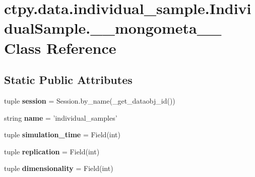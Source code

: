\hypertarget{classctpy_1_1data_1_1individual__sample_1_1_individual_sample_1_1____mongometa____}{\section{ctpy.\-data.\-individual\-\_\-sample.\-Individual\-Sample.\-\_\-\-\_\-mongometa\-\_\-\-\_\- Class Reference}
\label{classctpy_1_1data_1_1individual__sample_1_1_individual_sample_1_1____mongometa____}
}
\subsection*{Static Public Attributes}
\begin{DoxyCompactItemize}
\item 
\hypertarget{classctpy_1_1data_1_1individual__sample_1_1_individual_sample_1_1____mongometa_____a2503272356a85d365ca5fe9022dc2bd3}{tuple {\bfseries session} = Session.\-by\-\_\-name(\-\_\-get\-\_\-dataobj\-\_\-id())}\label{classctpy_1_1data_1_1individual__sample_1_1_individual_sample_1_1____mongometa_____a2503272356a85d365ca5fe9022dc2bd3}

\item 
\hypertarget{classctpy_1_1data_1_1individual__sample_1_1_individual_sample_1_1____mongometa_____ab3e1a4de8dc2663ae335ba2ff826632c}{string {\bfseries name} = 'individual\-\_\-samples'}\label{classctpy_1_1data_1_1individual__sample_1_1_individual_sample_1_1____mongometa_____ab3e1a4de8dc2663ae335ba2ff826632c}

\item 
\hypertarget{classctpy_1_1data_1_1individual__sample_1_1_individual_sample_1_1____mongometa_____a7879ac06f9f17ba10c7d6c874b6c3a6a}{tuple {\bfseries simulation\-\_\-time} = Field(int)}\label{classctpy_1_1data_1_1individual__sample_1_1_individual_sample_1_1____mongometa_____a7879ac06f9f17ba10c7d6c874b6c3a6a}

\item 
\hypertarget{classctpy_1_1data_1_1individual__sample_1_1_individual_sample_1_1____mongometa_____a72da7128b0a56c256e7c160e1a4f6f05}{tuple {\bfseries replication} = Field(int)}\label{classctpy_1_1data_1_1individual__sample_1_1_individual_sample_1_1____mongometa_____a72da7128b0a56c256e7c160e1a4f6f05}

\item 
\hypertarget{classctpy_1_1data_1_1individual__sample_1_1_individual_sample_1_1____mongometa_____a4b1a0126805abdd1227bbf8e27d85b99}{tuple {\bfseries dimensionality} = Field(int)}\label{classctpy_1_1data_1_1individual__sample_1_1_individual_sample_1_1____mongometa_____a4b1a0126805abdd1227bbf8e27d85b99}


\end{DoxyCompactItemize}
